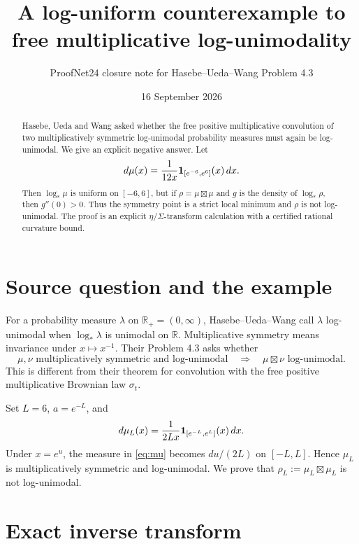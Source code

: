 \documentclass[11pt]{article}
\title{A log-uniform counterexample to free multiplicative log-unimodality}
\author{ProofNet24 closure note for Hasebe--Ueda--Wang Problem 4.3}
\date{16 September 2026}
\newcommand{\R}{\mathbb R}
\newcommand{\boxt}{\mathbin{\boxtimes}}
\begin{document}
\maketitle

\begin{abstract}
Hasebe, Ueda and Wang asked whether the free positive multiplicative convolution
of two multiplicatively symmetric log-unimodal probability measures must again
be log-unimodal.  We give an explicit negative answer.  Let
\[
 d\mu(x)=\frac{1}{12x}{\bf 1}_{[e^{-6},e^6]}(x)\,dx.
\]
Then $\log_*\mu$ is uniform on $[-6,6]$, but if $\rho=\mu\boxt\mu$ and $g$
is the density of $\log_*\rho$, then $g''(0)>0$.  Thus the symmetry point is a
strict local minimum and $\rho$ is not log-unimodal.  The proof is an explicit
$\eta$/$\Sigma$-transform calculation with a certified rational curvature bound.
\end{abstract}

\section{Source question and the example}

For a probability measure $\lambda$ on $\R_+=(0,\infty)$, Hasebe--Ueda--Wang
call $\lambda$ log-unimodal when $\log_*\lambda$ is unimodal on $\R$.
Multiplicative symmetry means invariance under $x\mapsto x^{-1}$.
Their Problem 4.3 asks whether
\[
 \mu,\nu \text{ multiplicatively symmetric and log-unimodal}
 \quad\Longrightarrow\quad
 \mu\boxt\nu \text{ log-unimodal}.
\]
This is different from their theorem for convolution with the free positive
multiplicative Brownian law $\sigma_t$.

Set $L=6$, $a=e^{-L}$, and
\begin{equation}\label{eq:mu}
 d\mu_L(x)=\frac{1}{2Lx}{\bf 1}_{[e^{-L},e^L]}(x)\,dx.
\end{equation}
Under $x=e^u$, the measure in \eqref{eq:mu} becomes $du/(2L)$ on $[-L,L]$.
Hence $\mu_L$ is multiplicatively symmetric and log-unimodal.  We prove that
$\rho_L:=\mu_L\boxt\mu_L$ is not log-unimodal.

\section{Exact inverse transform}
\end{document}
